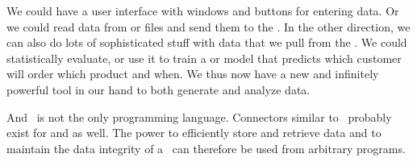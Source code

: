 We could have a user interface with windows and buttons for entering data.
Or we could read data from  or  files and send them to the \dbms.
In the other direction, we can also do lots of sophisticated stuff with data that we pull from the \db.
We could statistically evaluate, or use it to train a  or  model that predicts which customer will order which product and when.
We thus now have a new and infinitely powerful tool in our hand to both generate and analyze data.

And \python\ is not the only programming language.
Connectors similar to \psycopg\ probably exist for  and  as well.
The power to efficiently store and retrieve data and to maintain the data integrity of a \dbms\ can therefore be used from arbitrary programs.%
%
\FloatBarrier%
\endhsection%
%
